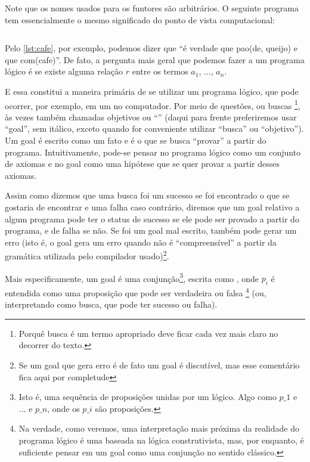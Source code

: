 \documentclass{article}
\begin{document}
Note que os nomes usados para os funtores são arbitrários. O seguinte programa tem essencialmente o mesmo significado do ponto de vista computacional:\\

%
\inputminted{prolog}{../Exemplos/Cap0/prog2_queijo.pl}\label{lst:queijo}

Pelo \ref{lst:cafe}, por exemplo, podemos dizer que ``é verdade que pao(de, queijo) e que com(cafe)''. De fato, a pergunta mais
geral que podemos fazer a um programa lógico é se existe alguma relação $r$ entre os termos $a_1$, ..., $a_n$.

E essa constitui a maneira primária de se utilizar um programa lógico, que pode ocorrer, por exemplo, em um  no computador. Por meio de questões, ou buscas \footnote{Porquê busca é um termo apropriado deve ficar cada vez mais claro no decorrer do texto.}, às vezes também chamadas objetivos ou ``'' (daqui para frente preferiremos usar ``goal'', sem itálico, exceto quando for conveniente utilizar ``busca'' ou ``objetivo''). Um goal é escrito como um fato e é o que se busca ``provar'' a partir do programa. Intuitivamente, pode-se pensar no programa lógico como um conjunto de axiomas e no goal como uma hipótese que se quer provar a partir desses axiomas.

Assim como dizemos que uma busca foi um sucesso se foi encontrado o que se gostaria de encontrar e uma falha caso contrário,
diremos que um goal relativo a algum programa pode ter o status de sucesso se ele pode ser provado a partir do programa, e de
falha se não. Se foi um goal mal escrito, também pode gerar um erro (isto é, o goal gera um erro quando não é ``compreensível'' a
partir da gramática utilizada pelo compilador usado)\footnote{Se um goal que gera erro é de fato um goal é discutível, mas esse comentário fica aqui por completude}.

Mais especificamente, um goal é uma conjunção\footnote{Isto é, uma sequência de proposições unidas por um  lógico. Algo como $p\_1$ e
  ... e $p\_n$, onde os $p\_i$ são proposições.}, escrita como , onde $p_i$ é
entendida como uma proposição que pode ser verdadeira ou falsa \footnote{Na verdade, como veremos, uma interpretação mais próxima da realidade do programa lógico é uma baseada na lógica construtivista, mas, por enquanto, é suficiente pensar em um goal como uma conjunção no sentido clássico.} (ou, interpretando como busca, que pode ter sucesso ou falha).
\end{document}
